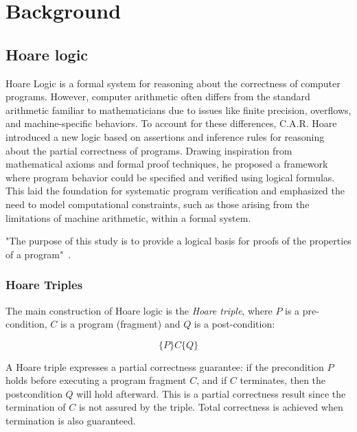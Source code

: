 
%


\chapter{Background}
\label{cha:Background}


\section{Hoare logic}
\label{sec:Hoare_logic}

Hoare Logic is a formal system for reasoning about the correctness of computer programs. However, 
computer arithmetic often differs from the standard arithmetic familiar to mathematicians due to issues like finite 
precision, overflows, and machine-specific behaviors. To account for these differences, C.A.R. Hoare introduced a new logic
based on assertions and inference rules for reasoning about the partial correctness of programs. Drawing inspiration 
from mathematical axioms and formal proof techniques, he proposed a framework where program behavior could be specified 
and verified using logical formulas. This laid the foundation for systematic program verification and emphasized the need 
to model computational constraints, such as those arising from the limitations of machine arithmetic, within a formal system.

"The purpose of this study is to provide a logical basis for proofs of the properties of a program"~\cite{Hoare69}.

\subsection{Hoare Triples}

The main construction of Hoare logic is the \textit{Hoare triple}, where $P$ is a pre-condition, $C$ is a program (fragment) 
and $Q$ is a post-condition:

\[ 
  \{P\}C\{Q\}
\]

A Hoare triple expresses a partial correctness guarantee: if the precondition $P$ holds before executing a program fragment 
$C$, and if $C$ terminates, then the postcondition $Q$ will hold afterward. This is a partial correctness result since the 
termination of $C$ is not assured by the triple. Total correctness is achieved when termination is also guaranteed.

